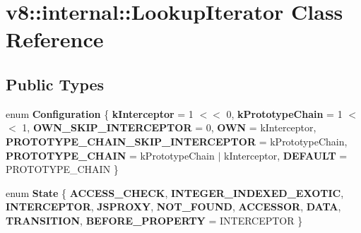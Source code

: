 \hypertarget{classv8_1_1internal_1_1LookupIterator}{}\section{v8\+:\+:internal\+:\+:Lookup\+Iterator Class Reference}
\label{classv8_1_1internal_1_1LookupIterator}
\subsection*{Public Types}
\begin{DoxyCompactItemize}
\item 
\mbox{\label{classv8_1_1internal_1_1LookupIterator_ab4619027a1f080b1d2d82bfc2462fada}} 
enum {\bfseries Configuration} \{ \newline
{\bfseries k\+Interceptor} = 1 $<$$<$ 0, 
{\bfseries k\+Prototype\+Chain} = 1 $<$$<$ 1, 
{\bfseries O\+W\+N\+\_\+\+S\+K\+I\+P\+\_\+\+I\+N\+T\+E\+R\+C\+E\+P\+T\+OR} = 0, 
{\bfseries O\+WN} = k\+Interceptor, 
\newline
{\bfseries P\+R\+O\+T\+O\+T\+Y\+P\+E\+\_\+\+C\+H\+A\+I\+N\+\_\+\+S\+K\+I\+P\+\_\+\+I\+N\+T\+E\+R\+C\+E\+P\+T\+OR} = k\+Prototype\+Chain, 
{\bfseries P\+R\+O\+T\+O\+T\+Y\+P\+E\+\_\+\+C\+H\+A\+IN} = k\+Prototype\+Chain $\vert$ k\+Interceptor, 
{\bfseries D\+E\+F\+A\+U\+LT} = P\+R\+O\+T\+O\+T\+Y\+P\+E\+\_\+\+C\+H\+A\+IN
 \}
\item 
\mbox{\label{classv8_1_1internal_1_1LookupIterator_aa7fbcb80d73cb5ee869915438ee81ca9}} 
enum {\bfseries State} \{ \newline
{\bfseries A\+C\+C\+E\+S\+S\+\_\+\+C\+H\+E\+CK}, 
{\bfseries I\+N\+T\+E\+G\+E\+R\+\_\+\+I\+N\+D\+E\+X\+E\+D\+\_\+\+E\+X\+O\+T\+IC}, 
{\bfseries I\+N\+T\+E\+R\+C\+E\+P\+T\+OR}, 
{\bfseries J\+S\+P\+R\+O\+XY}, 
\newline
{\bfseries N\+O\+T\+\_\+\+F\+O\+U\+ND}, 
{\bfseries A\+C\+C\+E\+S\+S\+OR}, 
{\bfseries D\+A\+TA}, 
{\bfseries T\+R\+A\+N\+S\+I\+T\+I\+ON}, 
\newline
{\bfseries B\+E\+F\+O\+R\+E\+\_\+\+P\+R\+O\+P\+E\+R\+TY} = I\+N\+T\+E\+R\+C\+E\+P\+T\+OR
 \}
\end{DoxyCompactItemize}
